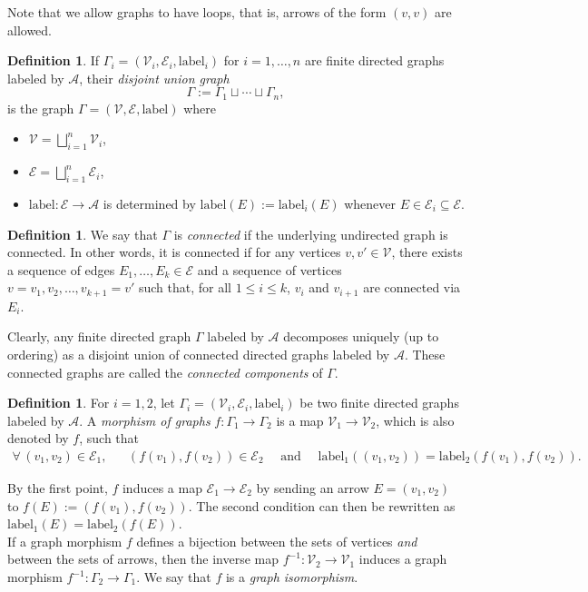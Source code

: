 \documentclass[12pt]{amsart}
\theoremstyle{definition}
\newtheorem{definition}[theorem]{Definition}
\newcommand{\<}{\langle}   %
\renewcommand{\>}{\rangle} %
\begin{document}
Note that we allow graphs to have loops, that is, arrows of the form $(v,v)$ are allowed. 

\begin{definition}
If $\Gamma_i = (\mathcal V_i, \mathcal E_i, \mathrm{label}_i)$ for $i=1,\ldots , n$ are finite directed graphs labeled by $\mathcal A$, their \textit{disjoint union graph} 
\begin{equation*}
    \Gamma := \Gamma_1 \sqcup \cdots \sqcup \Gamma_n,
\end{equation*}
is the graph $\Gamma = (\mathcal V, \mathcal E, \mathrm{label})$ where 
\begin{itemize}
    \item $\mathcal V = \bigsqcup_{i=1}^n \mathcal V_i$,
    \item $\mathcal E = \bigsqcup_{i=1}^n \mathcal E_i$,
    \item $\mathrm{label}:\mathcal E \to \mathcal A$ is determined by $\mathrm{label}(E) := \mathrm{label}_i(E)$ whenever $E \in \mathcal E_i \subseteq  \mathcal E$.
\end{itemize}
\end{definition}

\begin{definition}
We say that $\Gamma$ is \textit{connected} if the underlying undirected graph is connected. In other words, it is connected if for any vertices $v,v' \in \mathcal V$, there exists a sequence of edges $E_1,\ldots , E_k \in \mathcal E$ and a sequence of vertices $v = v_1, v_2,\ldots , v_{k+1} = v'$ such that, for all $1 \leq i \leq k$, $v_i$ and $v_{i+1}$ are connected via $E_i$.
\end{definition}

Clearly, any finite directed graph $\Gamma$ labeled by $\mathcal A$ decomposes uniquely (up to ordering) as a disjoint union of connected directed graphs labeled by $\mathcal A$. These connected graphs are called the \textit{connected components} of $\Gamma$.

\begin{definition}
    For $i=1,2$, let $\Gamma_i = (\mathcal V_i, \mathcal E_i, \mathrm{label}_i)$ be two finite directed graphs labeled by $\mathcal A$. A \textit{morphism of graphs} $f:\Gamma_1 \to \Gamma_2$ is a map $\mathcal V_1 \to \mathcal V_2$, which is also denoted by $f$, such that
    \begin{align*}
        \forall\, (v_1,v_2) \in \mathcal E_1, & & (f(v_1),f(v_2)) \in \mathcal E_2 \quad \text{ and } \quad \mathrm{label}_1((v_1,v_2)) = \mathrm{label}_2(f(v_1),f(v_2)).
    \end{align*}
\end{definition}
By the first point, $f$ induces a map $\mathcal E_1 \to \mathcal E_2$ by sending an arrow $E = (v_1,v_2)$ to $f(E) := (f(v_1),f(v_2))$. The second condition can then be rewritten as $\mathrm{label}_1(E) = \mathrm{label}_2(f(E))$.\\
If a graph morphism $f$ defines a bijection between the sets of vertices \textit{and} between the sets of arrows, then the inverse map $f^{-1}:\mathcal V_2 \to \mathcal V_1$ induces a graph morphism $f^{-1}:\Gamma_2 \to \Gamma_1$. We say that $f$ is a \textit{graph isomorphism}.
\end{document}
